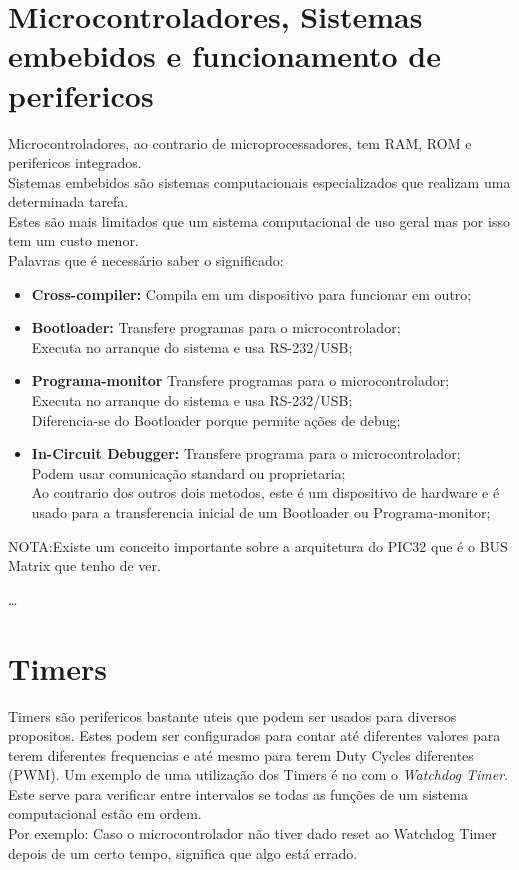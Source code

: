 \documentclass[a4paper, 11pt, onecolumn, oneside]{scrartcl}
\begin{document}
\section{Microcontroladores, Sistemas embebidos e funcionamento de perifericos}
Microcontroladores, ao contrario de microprocessadores, tem RAM, ROM e perifericos integrados.\\
\newline
Sistemas embebidos são sistemas computacionais especializados que realizam uma determinada tarefa.\\
Estes são mais limitados que um sistema computacional de uso geral mas por isso tem um custo menor.\\
\clearpage
Palavras que é necessário saber o significado:
\begin{itemize}
  \item \textbf{Cross-compiler:} Compila em um dispositivo para funcionar em outro;
  \item \textbf{Bootloader:} Transfere programas para o microcontrolador;\\
  Executa no arranque do sistema e usa RS-232/USB;\@
  \item \textbf{Programa-monitor} Transfere programas para o microcontrolador;\\
  Executa no arranque do sistema e usa RS-232/USB;\\
  Diferencia-se do Bootloader porque permite ações de debug;
  \item \textbf{In-Circuit Debugger:} Transfere programa para o microcontrolador;\\
  Podem usar comunicação standard ou proprietaria;\\
  Ao contrario dos outros dois metodos, este é um dispositivo de hardware e é usado
  para a transferencia inicial de um Bootloader ou Programa-monitor; 
\end{itemize}
NOTA:\@ Existe um conceito importante sobre a arquitetura do PIC32 que é o BUS Matrix que tenho de ver.

\dots

\section{Timers}
Timers são perifericos bastante uteis que podem ser usados para diversos propositos.
\newline
Estes podem ser configurados para contar até diferentes valores para terem diferentes frequencias e até mesmo para terem Duty Cycles diferentes (PWM).
\newline
Um exemplo de uma utilização dos Timers é no com o \textit{Watchdog Timer}. Este serve para verificar 
entre intervalos se todas as funções de um sistema computacional estão em ordem.
\\Por exemplo: Caso o microcontrolador não tiver dado reset ao Watchdog Timer depois de um certo tempo, 
significa que algo está errado.
\end{document}
